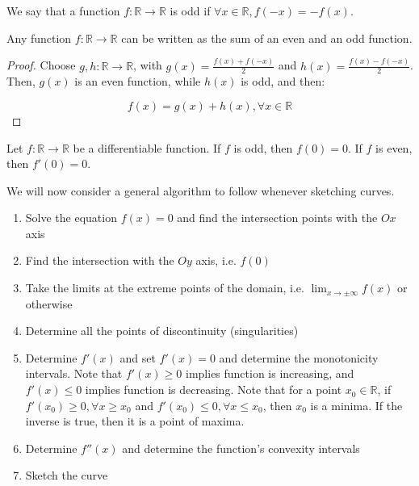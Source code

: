 \documentclass[12pt]{article}
\begin{document}
\begin{definition}
    We say that a function $f : \mathbb{R} \to \mathbb{R}$ is odd if $\forall x \in \mathbb{R}, f(-x) = -f(x)$.
\end{definition}

\begin{theorem}
    Any function $f : \mathbb{R} \to \mathbb{R}$ can be written as the sum of an even and an odd function.
\end{theorem}

\begin{proof}
    Choose $g, h : \mathbb{R} \to \mathbb{R}$, with $g(x) = \frac{f(x) + f(-x)}{2}$ and $h(x) = \frac{f(x) - f(-x)}{2}$. Then, $g(x)$ is an even function, while $h(x)$ is odd, and then:

    \[ f(x) = g(x) + h(x), \forall x \in \mathbb{R} \]
\end{proof}

\begin{theorem}
    Let $f : \mathbb{R} \to \mathbb{R}$ be a differentiable function. If $f$ is odd, then $f(0) = 0$. If $f$ is even, then $f'(0) = 0$.
\end{theorem}

We will now consider a general algorithm to follow whenever sketching curves.

\begin{enumerate}
    \item Solve the equation $f(x) = 0$ and find the intersection points with the $Ox$ axis
    \item Find the intersection with the $Oy$ axis, i.e. $f(0)$
    \item Take the limits at the extreme points of the domain, i.e. $\lim_{x \to \pm \infty} f(x)$ or otherwise
    \item Determine all the points of discontinuity (singularities)
    \item Determine $f'(x)$ and set $f'(x) = 0$ and determine the monotonicity intervals. Note that $f'(x) \geq 0$ implies function is increasing, and $f'(x) \leq 0$ implies function is decreasing. Note that for a point $x_0 \in \mathbb{R}$, if $f'(x_0) \geq 0, \forall x \geq x_0$ and $f'(x_0) \leq 0, \forall x \leq x_0$, then $x_0$ is a minima. If the inverse is true, then it is a point of maxima.
    \item Determine $f''(x)$ and determine the function's convexity intervals
    \item Sketch the curve
\end{enumerate}
\end{document}
